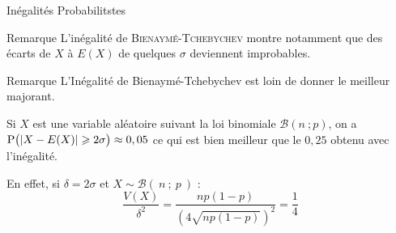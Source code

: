 \documentclass{cours}
\begin{document}
\begin{Gpartie}{Inégalités Probabilitstes}
\begin{Spartie}{Remarque}
            L'inégalité de \textsc{Bienaymé-Tchebychev} montre notamment que des écarts de $X$ à $E(X)$ de quelques $\sigma$ deviennent improbables.
        \end{Spartie}
        \begin{Spartie}{Remarque} 
            L'Inégalité de Bienaymé-Tchebychev est loin de donner le meilleur majorant.

            Si $X$ est une variable aléatoire suivant la loi binomiale $\mathcal{B}\left(n~;p\right)$, on a $\mathrm{P}\big(\vert X-E(X)\rvert\geqslant 2\sigma\big)\approx 0,05$ ce qui est bien meilleur que le $0,25$ obtenu avec l'inégalité.

            En effet, si $\delta=2\sigma$ et $X\sim\mathcal{B}(~n~;~p~)$ : \[\frac{V(X)}{\delta^2}=\frac{np(1-p)}{\left(4\sqrt{np(1-p)}\right)^2}=\frac{1}{4}\]
        \end{Spartie}
    \end{Gpartie}
    \pagebreak
\end{document}
